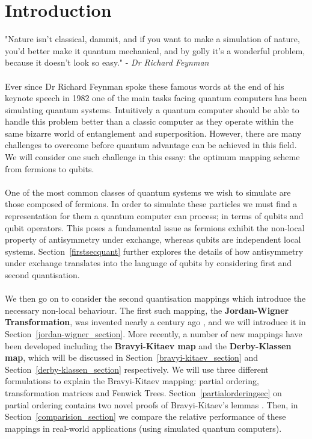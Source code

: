 \documentclass[twoside]{article}
\begin{document}
\section{Introduction}
"Nature isn't classical, dammit, and if you want to make a simulation of nature, you'd better make it quantum mechanical, and by golly it's a wonderful problem, because it doesn't look so easy." - \textsl{Dr Richard Feynman} \cite{feynmann}  \\\\
Ever since Dr Richard Feynman spoke these famous words at the end of his keynote speech in 1982 one of the main tasks facing quantum computers has been simulating quantum systems. Intuitively a quantum computer should be able to handle this problem better than a classic computer as they operate within the same bizarre world of entanglement and superposition. However, there are many challenges to overcome before quantum advantage can be achieved in this field. We will consider one such challenge in this essay: the optimum mapping scheme from fermions to qubits.\\\\
One of the most common classes of quantum systems we wish to simulate are those composed of fermions. In order to simulate these particles we must find a representation for them a quantum computer can process; in terms of qubits and qubit operators. This poses a fundamental issue as fermions exhibit the non-local property of antisymmetry under exchange, whereas qubits are independent local systems. Section~\ref{firstsecquant} further explores the details of how antisymmetry under exchange translates into the language of qubits by considering first and second quantisation. \\\\
We then go on to consider the second quantisation mappings which introduce the necessary non-local behaviour. The first such mapping, the \textbf{Jordan-Wigner Transformation}, was invented nearly a century ago \cite{originalJordanWigner}, and we will introduce it in Section~\ref{jordan-wigner_section}. More recently, a number of new mappings have been developed including the \textbf{Bravyi-Kitaev map} and the \textbf{Derby-Klassen map}, which will be discussed in Section~\ref{bravyi-kitaev_section} and Section~\ref{derby-klassen_section} respectively. We will use three different formulations to explain the Bravyi-Kitaev mapping: partial ordering, transformation matrices and Fenwick Trees. Section~\ref{partialorderingsec} on partial ordering contains two novel proofs of Bravyi-Kitaev's lemmas \cite{bravyikitaev}. Then, in Section~\ref{comparision_section} we compare the relative performance of these mappings in real-world applications (using simulated quantum computers).
\end{document}

